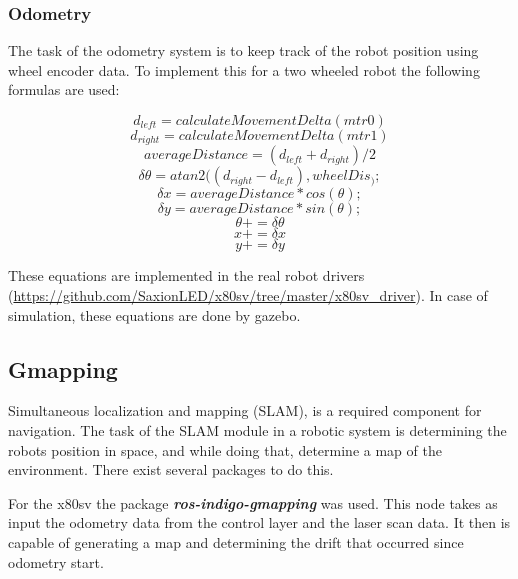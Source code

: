 \documentclass[a4paper]{article}
\newcommand{\rospackage}[1]{\textbf{\textit{ros-indigo-#1}}}
\begin{document}
\subsubsection{Odometry}
The task of the odometry system is to keep track of the robot position using wheel encoder
data. To implement this for a two wheeled robot the following formulas are used:

\begin{equation}
 d_{left} = calculateMovementDelta(mtr0)
\end{equation}
\begin{equation}
 d_{right} = calculateMovementDelta(mtr1)
\end{equation}
\begin{equation}
 averageDistance = (d_{left} + d_{right}) / 2
\end{equation}
\begin{equation}
 \delta \theta = atan2((d_{right} - d_{left}), wheelDis_);
\end{equation}
\begin{equation}
 \delta x = averageDistance * cos(\theta);
\end{equation}
\begin{equation}
 \delta y = averageDistance * sin(\theta);
\end{equation}
\begin{equation}
 \theta += \delta \theta
\end{equation}
\begin{equation}
 x += \delta x
\end{equation}
\begin{equation}
 y += \delta y
\end{equation}

These equations are implemented in the real robot drivers (\url{https://github.com/SaxionLED/x80sv/tree/master/x80sv_driver}). In case of simulation, these equations are done by gazebo.

\subsection{Gmapping}

Simultaneous localization and mapping (SLAM), is a required component for navigation.
The task of the SLAM module in a robotic system is determining the robots position
in space, and while doing that, determine a map of the environment. There exist
several packages to do this.

For the x80sv the package \rospackage{gmapping} \cite{gmapping} was used.
This node takes as input the odometry data from the control layer and the laser scan
data. It then is capable of generating a map and determining the drift that occurred
since odometry start.
\end{document}
